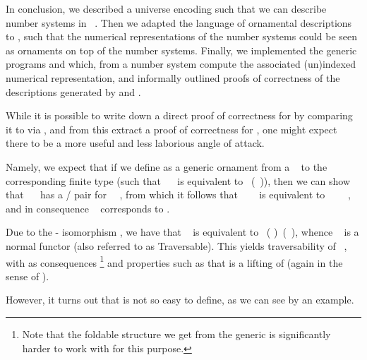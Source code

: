 In conclusion, we described a universe encoding  such that we can describe number systems in \ . Then we adapted the language of ornamental descriptions  to , such that the numerical representations of the number systems could be seen as ornaments on top of the number systems. Finally, we implemented the generic programs  and  which, from a number system compute the associated (un)indexed numerical representation, and informally outlined proofs of correctness of the descriptions generated by  and . 

While it is possible to write down a direct proof of correctness for  by comparing it to  via , and from this extract a proof of correctness for , one might expect there to be a more useful and less laborious angle of attack. 

Namely, we expect that if we define  as a generic ornament from a \  to the corresponding finite type (such that \ \  is equivalent to \ (\ )), then we can show that \ \  has a / pair for \ \ , from which it follows that \ \ \  is equivalent to \ \ \ \ , and in consequence \  corresponds to . %

Due to the - isomorphism \cite{algorn}, we have that \  is equivalent to \ ( )\ (\ ), whence \  is a normal functor (also referred to as Traversable). This yields traversability of \ , with as consequences \footnote{Note that the foldable structure we get from the generic  is significantly harder to work with for this purpose.} and properties such as that  is a lifting of  (again in the sense of \cite{orntrans}).

However, it turns out that  is not so easy to define, as we can see by an example.

